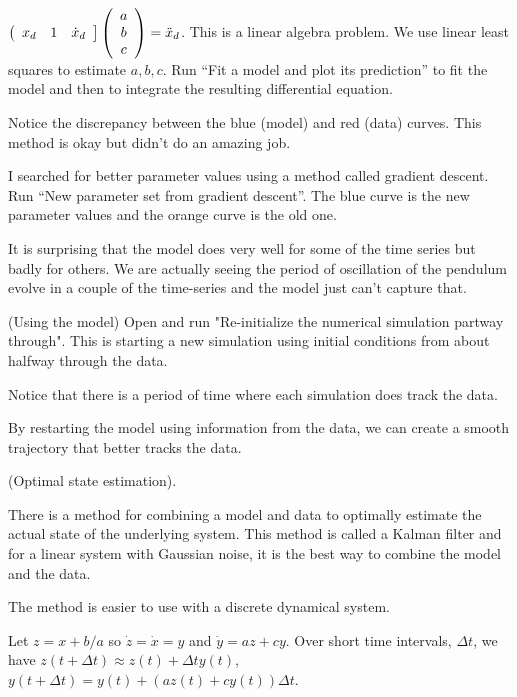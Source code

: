 \documentclass[12pt,letterpaper,noanswers]{exam}
\begin{document}
\begin{questions}
\begin{parts}
$\left(\begin{array}{c c c }x_d &1 &\dot x_d\end{array}\right]\left(\begin{array}{c} a \\ b \\ c \end{array}\right) = \ddot x_d$.  This is a linear algebra problem.  We use linear least squares to estimate $a,b, c$.  Run ``Fit a model and plot its prediction'' to fit the model and then to integrate the resulting differential equation.
\item Notice the discrepancy between the blue (model) and red (data) curves.  This method is okay but didn't do an amazing job.
\item I searched for better parameter values using a method called gradient descent.  Run ``New parameter set from gradient descent''.  The blue curve is the new parameter values and the orange curve is the old one.  

It is surprising that the model does very well for some of the time series but badly for others.  We are actually seeing the period of oscillation of the pendulum evolve in a couple of the time-series and the model just can't capture that.
\end{parts}

\question (Using the model) Open and run "Re-initialize the numerical simulation partway through".  This is starting a new simulation using initial conditions from about halfway through the data.  

Notice that there is a period of time where each simulation does track the data.

By restarting the model using information from the data, we can create a smooth trajectory that better tracks the data.

\question (Optimal state estimation).

There is a method for combining a model and data to optimally estimate the actual state of the underlying system.  This method is called a Kalman filter and for a linear system with Gaussian noise, it is the best way to combine the model and the data.

\begin{parts}
\item The method is easier to use with a discrete dynamical system.

Let $z = x + b/a$ so $\dot z = \dot x = y$ and $\dot y = a z + c y$.  Over short time intervals, $\Delta t$, we have $z(t+ \Delta t) \approx z(t) + \Delta t y(t)$, $y(t+\Delta t) = y(t) + \left(az(t) + cy(t)\right)\Delta t$.  



\end{parts}
\end{questions}
\end{document}
